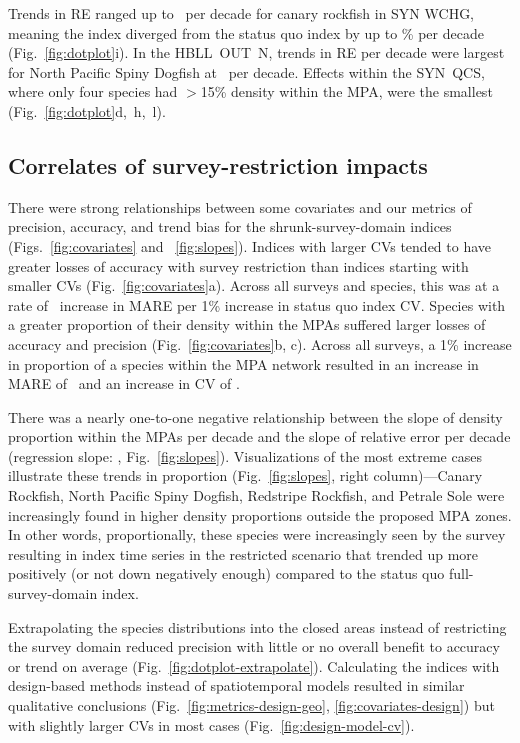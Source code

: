 \documentclass[12pt]{article}
\begin{document}
Trends in RE ranged up to \canaryrockfishSYNWCHGslopere\ per decade for canary rockfish in SYN WCHG, meaning the index diverged from the status quo index by up to \canaryrockfishSYNWCHGsloperePerc\% per decade (Fig.~\ref{fig:dotplot}i).
In the HBLL~OUT~N, trends in RE per decade were largest for North Pacific Spiny Dogfish at \northpacificspinydogfishSYNWCHGslopere\ per decade.
Effects within the SYN~QCS, where only four species had $>$15\% density within the MPA, were the smallest (Fig.~\ref{fig:dotplot}d,~h,~l).

\subsection*{Correlates of survey-restriction impacts}

There were strong relationships between some covariates and our metrics of precision, accuracy, and trend bias for the shrunk-survey-domain indices (Figs.~\ref{fig:covariates} and ~\ref{fig:slopes}).
Indices with larger CVs tended to have greater losses of accuracy with survey restriction than indices starting with smaller CVs (Fig.~\ref{fig:covariates}a).
Across all surveys and species, this was at a rate of \covCvmaregeostat\ increase in MARE per 1\% increase in status quo index CV.
Species with a greater proportion of their density within the MPAs suffered larger losses of accuracy and precision (Fig.~\ref{fig:covariates}b, c).
Across all surveys, a 1\% increase in proportion of a species within the MPA network resulted in an increase in MARE of \covMareGeo\ and an increase in CV of \covPrecisionGeo.

There was a nearly one-to-one negative relationship between the slope of density proportion within the MPAs per decade and the slope of relative error per decade (regression slope: \REslopeRegress, Fig.~\ref{fig:slopes}).
Visualizations of the most extreme cases illustrate these trends in proportion (Fig.~\ref{fig:slopes}, right column)---Canary Rockfish, North Pacific Spiny Dogfish, Redstripe Rockfish, and Petrale Sole were increasingly found in higher density proportions outside the proposed MPA zones.
In other words, proportionally, these species were increasingly seen by the survey resulting in index time series in the restricted scenario that trended up more positively (or not down negatively enough) compared to the status quo full-survey-domain index.

Extrapolating the species distributions into the closed areas instead of restricting the survey domain reduced precision with little or no overall benefit to accuracy or trend on average (Fig.~\ref{fig:dotplot-extrapolate}).
Calculating the indices with design-based methods instead of spatiotemporal models resulted in similar qualitative conclusions (Fig.~\ref{fig:metrics-design-geo}, \ref{fig:covariates-design}) but with slightly larger CVs in most cases (Fig.~\ref{fig:design-model-cv}).
\end{document}
